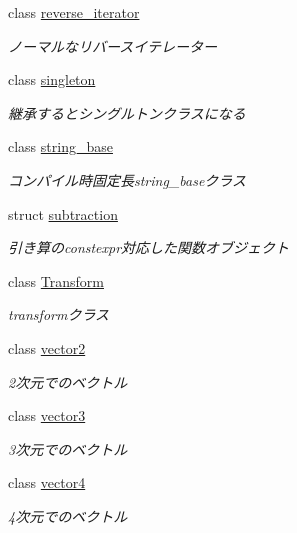 \begin{DoxyCompactItemize}
class \mbox{\hyperlink{classsaki_1_1reverse__iterator}{reverse\+\_\+iterator}}
\begin{DoxyCompactList}\small\item\em ノーマルなリバースイテレーター \end{DoxyCompactList}\item 
class \mbox{\hyperlink{classsaki_1_1singleton}{singleton}}
\begin{DoxyCompactList}\small\item\em 継承するとシングルトンクラスになる \end{DoxyCompactList}\item 
class \mbox{\hyperlink{classsaki_1_1string__base}{string\+\_\+base}}
\begin{DoxyCompactList}\small\item\em コンパイル時固定長string\+\_\+baseクラス \end{DoxyCompactList}\item 
struct \mbox{\hyperlink{structsaki_1_1subtraction}{subtraction}}
\begin{DoxyCompactList}\small\item\em 引き算のconstexpr対応した関数オブジェクト \end{DoxyCompactList}\item 
class \mbox{\hyperlink{classsaki_1_1_transform}{Transform}}
\begin{DoxyCompactList}\small\item\em transformクラス \end{DoxyCompactList}\item 
class \mbox{\hyperlink{classsaki_1_1vector2}{vector2}}
\begin{DoxyCompactList}\small\item\em 2次元でのベクトル \end{DoxyCompactList}\item 
class \mbox{\hyperlink{classsaki_1_1vector3}{vector3}}
\begin{DoxyCompactList}\small\item\em 3次元でのベクトル \end{DoxyCompactList}\item 
class \mbox{\hyperlink{classsaki_1_1vector4}{vector4}}
\begin{DoxyCompactList}\small\item\em 4次元でのベクトル \end{DoxyCompactList}\end{DoxyCompactItemize}
